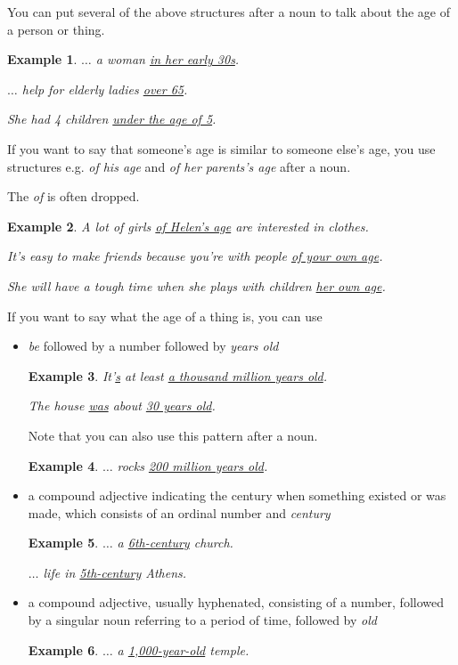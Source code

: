 \documentclass[oneside]{book}
\numberwithin{equation}{section}
\newtheorem{example}{Example}[section]
\begin{document}
%
\noindent{} You can put several of the above structures after a noun to talk about the age of a person or thing.
\begin{example}
    $\ldots$ a woman \underline{in her early 30s}.
    
    $\ldots$ help for elderly ladies \underline{over 65}.
    
    She had 4 children \underline{under the age of 5}.
\end{example}
%
\noindent{} If you want to say that someone's age is similar to someone else's age, you use structures e.g. \textit{of his age} and \textit{of her parents's age} after a noun.

The \textit{of} is often dropped.
\begin{example}
    A lot of girls \underline{of Helen's age} are interested in clothes.
    
    It's easy to make friends because you're with people \underline{of your own age}.
    
    She will have a tough time when she plays with children \underline{her own age}.
\end{example}
%
\noindent{} If you want to say what the age of a thing is, you can use
\begin{itemize}
    \item \textit{be} followed by a number followed by \textit{years old}
    \begin{example}
        It'\underline{s} at least \underline{a thousand million years old}.
        
        The house \underline{was} about \underline{30 years old}.
    \end{example}
    Note that you can also use this pattern after a noun.
    \begin{example}
        $\ldots$ rocks \underline{200 million years old}.
    \end{example}
    \item a compound adjective indicating the century when something existed or was made, which consists of an ordinal number and \textit{century}
    \begin{example}
        $\ldots$ a \underline{6th-century} church.
        
        $\ldots$ life in \underline{5th-century} Athens.
    \end{example}
    \item a compound adjective, usually hyphenated, consisting of a number, followed by a singular noun referring to a period of time, followed by \textit{old}
    \begin{example}
        $\ldots$ a \underline{1,000-year-old} temple.
    \end{example}
\end{itemize}
\end{document}
